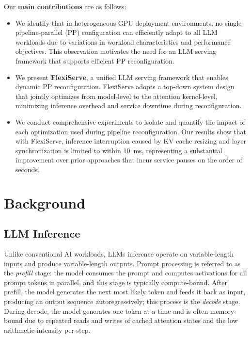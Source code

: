 \documentclass[sigplan,screen]{acmart}
\begin{document}
Our \textbf{main contributions} are as follows:
\begin{itemize}
    \item We identify that in heterogeneous GPU deployment environments, no single pipeline-parallel (PP) configuration can efficiently adapt to all LLM workloads due to variations in workload characteristics and performance objectives. This observation motivates the need for an LLM serving framework that supports efficient PP reconfiguration.
    \item We present \textbf{FlexiServe}, a unified LLM serving framework that enables dynamic PP reconfiguration. FlexiServe adopts a top-down system design that jointly optimizes from model-level to the attention kernel-level, minimizing inference overhead and service downtime during reconfiguration.
    \item We conduct comprehensive experiments to isolate and quantify the impact of each optimization used during pipeline reconfiguration. Our results show that with FlexiServe, inference interruption caused by KV cache resizing and layer synchronization is limited to within 10~ms, representing a substantial improvement over prior approaches that incur service pauses on the order of seconds.
\end{itemize}



\vspace{-1em}

\section{Background}
\subsection{LLM Inference}

Unlike conventional AI workloads, LLMs inference operate on variable-length inputs and produce variable-length outputs. Prompt processing is referred to as the \emph{prefill} stage: the model consumes the prompt and computes activations for all prompt tokens in parallel, and this stage is typically compute-bound. After prefill, the model generates the next most likely token and feeds it back as input, producing an output sequence autoregressively; this process is the \emph{decode} stage. During decode, the model generates one token at a time and is often memory-bound due to repeated reads and writes of cached attention states and the low arithmetic intensity per step.
\end{document}
